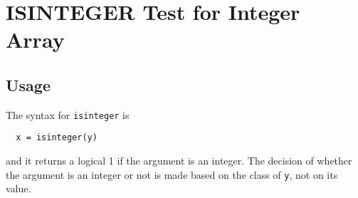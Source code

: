 \section{ISINTEGER Test for Integer Array}

\subsection{Usage}

The syntax for \verb|isinteger| is
\begin{verbatim}
  x = isinteger(y)
\end{verbatim}
and it returns a logical 1 if the argument is an integer.
The decision of whether the argument is an integer or not
is made based on the class of \verb|y|, not on its value.
